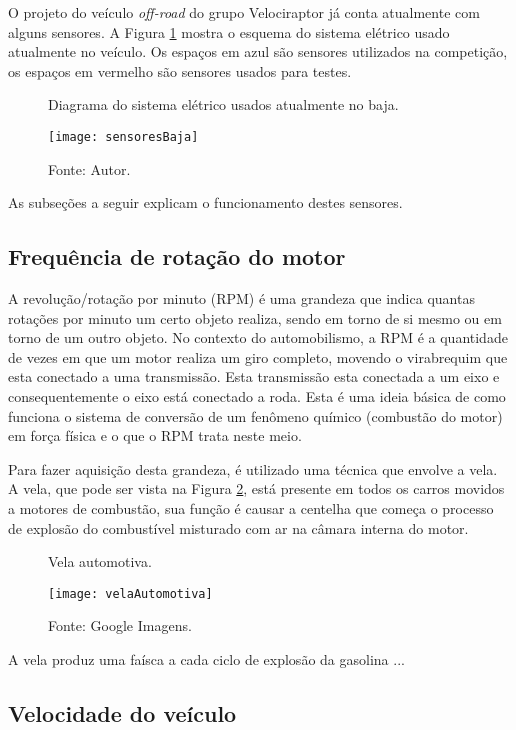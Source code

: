 O projeto do veículo \textit{off-road} do grupo Velociraptor já conta atualmente com alguns sensores. A Figura \ref{fig:sensoresBaja} mostra o esquema do sistema elétrico usado atualmente no veículo. Os espaços em azul são sensores utilizados na competição, os espaços em vermelho são sensores usados para testes. 

\begin{figure}[!htb]
	\centering
		\caption{Diagrama do sistema elétrico usados atualmente no baja.}
		\texttt{[image: sensoresBaja]} 
		\caption*{Fonte: Autor.}
		\label{fig:sensoresBaja}
\end{figure} 

As subseções a seguir explicam o funcionamento destes sensores.

\subsection{Frequência de rotação do motor}

A revolução/rotação por minuto (RPM) é uma grandeza que indica quantas rotações por minuto um certo objeto realiza, sendo em torno de si mesmo ou em torno de um outro objeto. No contexto do automobilismo, a RPM é a quantidade de vezes em que um motor realiza um giro completo, movendo o virabrequim que esta conectado a uma transmissão. Esta transmissão esta conectada a um eixo e consequentemente o eixo está conectado a roda. Esta é uma ideia básica de como funciona o sistema de conversão de um fenômeno químico (combustão do motor) em força física e o que o RPM trata neste meio.

Para fazer aquisição desta grandeza, é utilizado uma técnica que envolve a vela. A vela, que pode ser vista na Figura \ref{fig:vela}, está presente em todos os carros movidos a motores de combustão, sua função é causar a centelha que começa o processo de explosão do combustível misturado com ar na câmara interna do motor.       

\begin{figure}[!htb]
	\centering
		\caption{Vela automotiva.}
		\texttt{[image: velaAutomotiva]} 
		\caption*{Fonte: Google Imagens.}
		\label{fig:vela}
\end{figure} 

A vela produz uma faísca a cada ciclo de explosão da gasolina ...

\subsection{Velocidade do veículo}

